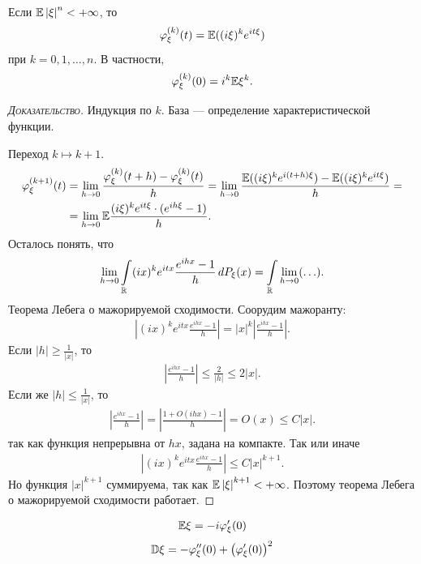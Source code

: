 \documentclass[../main.tex]{subfiles}
\begin{document}
\begin{thm}
 Если $ \mathbb E \left| \xi \right|^{n} < +\infty $, то
 \begin{align*}
  \varphi_\xi^{(k)}(t) = \mathbb E((i\xi)^{k}e^{it\xi})
 \end{align*} при $ k = 0, 1, \ldots, n $. В частности,
 \begin{align*}
  \varphi_\xi^{(k)}(0) = i^{k} \mathbb E\xi^{k}.
 \end{align*}
\end{thm}
\begin{proof}[\normalfont\textsc{Доказательство}]
 Индукция по $ k $. База --- определение характеристической функции.

 Переход $ k \mapsto k + 1 $.
 \begin{align*}
  \varphi_\xi^{(k+1)}(t) &= \lim_{h \to 0} \frac{\varphi_\xi^{(k)}(t+h) - \varphi_\xi^{(k)}(t)}{h} = \lim_{h \to 0} \frac{\mathbb E((i\xi)^{k}e^{i(t+h)\xi}) - \mathbb E((i\xi)^{k}e^{it\xi})}{h} = \\
  &= \lim_{h \to 0} \mathbb E \frac{(i\xi)^{k}e^{it\xi} \cdot (e^{ih\xi} - 1)}{h}.
 \end{align*} Осталось понять, что
 \begin{align*}
  \lim_{h \to 0} \int\limits_{\mathbb{R}} (ix)^{k}e^{itx} \frac{e^{ihx} - 1}{h}\,dP_\xi(x) = \int\limits_{\mathbb{R}} \lim_{h \to 0} (\ldots).
 \end{align*} Теорема Лебега о мажорируемой сходимости. Соорудим мажоранту:
 \begin{align*}
  \left| (ix)^{k}e^{itx}\frac{e^{ihx}-1}{h} \right| = \left| x \right|^{k} \left| \frac{e^{ihx}-1}{h} \right|.
 \end{align*} Если $ \left| h \right| \geqslant \frac{1}{\left| x \right|} $, то
 \begin{align*}
  \left| \frac{e^{ihx}-1}{h} \right| \leqslant \frac{2}{\left| h \right|} \leqslant 2 \left| x \right|.
 \end{align*} Если же $ \left| h \right| \leqslant \frac{1}{\left| x \right|} $, то
 \begin{align*}
  \left| \frac{e^{ihx}-1}{h} \right| = \left| \frac{1 + O(ihx) - 1}{h} \right| = O(x) \leqslant C \left| x \right|.
 \end{align*} так как функция непрерывна от $ hx $, задана на компакте. Так или иначе
 \begin{align*}
  \left| (ix)^{k}e^{itx}\frac{e^{ihx}-1}{h} \right| \leqslant C \left| x \right|^{k+1}. 
 \end{align*} Но функция $ \left| x \right|^{k+1} $ суммируема, так как $ \mathbb E \left| \xi \right|^{k+1}  < +\infty$. Поэтому теорема Лебега о мажорируемой сходимости работает.
\end{proof}
\begin{crly}
 \begin{align*}
  \mathbb E\xi = -i \varphi'_\xi(0)
 \end{align*}
 \begin{align*}
  \mathbb D\xi = -\varphi''_\xi(0) + \left( \varphi'_\xi(0) \right)^{2}
 \end{align*}
\end{crly}
\end{document}
